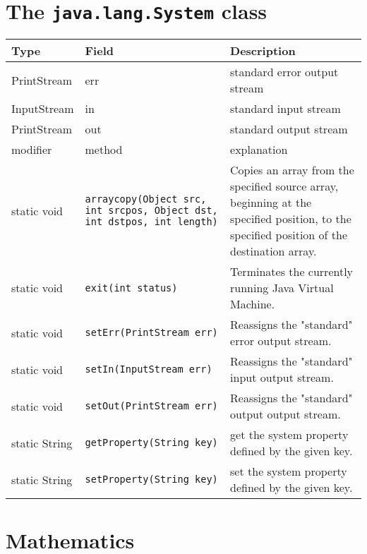 \section{The \texttt{java.lang.System} class}
  \begin{center}
    \begin{tabular}{lp{5cm}p{}}
      Type & Field & Description \\\hline
      PrintStream & err & standard error output stream \\
      InputStream & in & standard input stream \\
      PrintStream & out & standard output stream \\ \hline\hline
      modifier & method & explanation \\\hline
      static void & \verb|arraycopy(Object src, int srcpos, Object dst,| 
                    \verb|int dstpos, int length)| &
         Copies an array from the specified source array, beginning at 
         the specified position, to the specified position of the
         destination array. \\
      static void & \verb|exit(int status)| & Terminates the currently 
                                     running Java Virtual Machine.\\
      static void & \verb|setErr(PrintStream err)| &  
                   Reassigns the "standard" error output stream.\\
      static void & \verb|setIn(InputStream err)| &  
                   Reassigns the "standard" input output stream.\\
      static void & \verb|setOut(PrintStream err)| &  
                   Reassigns the "standard" output output stream.\\
      static String & \verb|getProperty(String key)| & get the system property
                            defined by the given key. \\
      static String & \verb|setProperty(String key)| & set the system property
                            defined by the given key. \\
    \end{tabular}
  \end{center}

\section{Mathematics}
